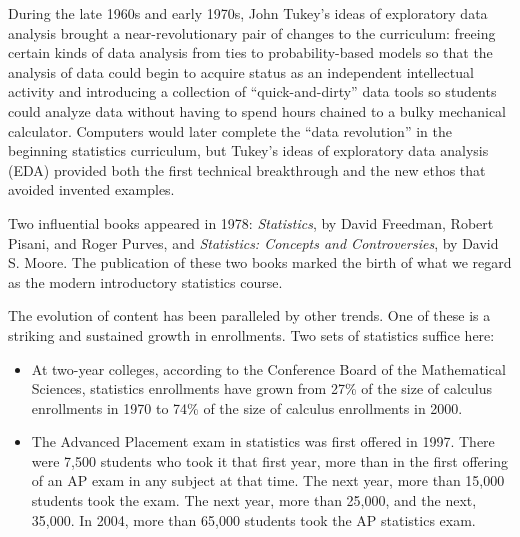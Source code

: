 \documentclass[twoside,openany]{tufte-book}
\begin{document}
During the late 1960s and early 1970s, John Tukey's ideas of exploratory data analysis brought a near-revolutionary pair of changes to the curriculum: freeing certain kinds of data analysis from ties to probability-based models so that the analysis of data could begin to acquire status as an independent intellectual activity and introducing a collection of ``quick-and-dirty'' data tools so students could analyze data without having to spend hours chained to a bulky mechanical calculator.  Computers would later complete the ``data revolution'' in the beginning statistics curriculum, but Tukey's ideas of exploratory data analysis (EDA) provided both the first technical breakthrough and the new ethos that avoided invented examples.  

Two influential books appeared in 1978:  \textit{Statistics}, by David Freedman, Robert Pisani, and Roger Purves, and \textit{Statistics: Concepts and Controversies}, by David S. Moore. The publication of these two books marked the birth of what we regard as the modern introductory statistics course.  

The evolution of content has been paralleled by other trends.  One of these is a striking and sustained growth in enrollments.  Two sets of statistics suffice here:  


\renewcommand\labelitemi{$\filledsquare$}
\begin{itemize}[leftmargin=1cm]
\item At two-year colleges, according to the Conference Board of the Mathematical Sciences, statistics enrollments have grown from 27\% of the size of calculus enrollments in 1970 to 74\% of the size of calculus enrollments in 2000.
\item The Advanced Placement exam in statistics was first offered in 1997.  There were 7,500 students who took it that first year, more than in the first offering of an AP exam in any subject at that time.  The next year, more than 15,000 students took the exam.  The next year, more than 25,000, and the next, 35,000.  In 2004, more than 65,000 students took the AP statistics exam.
\end{itemize}
\end{document}
